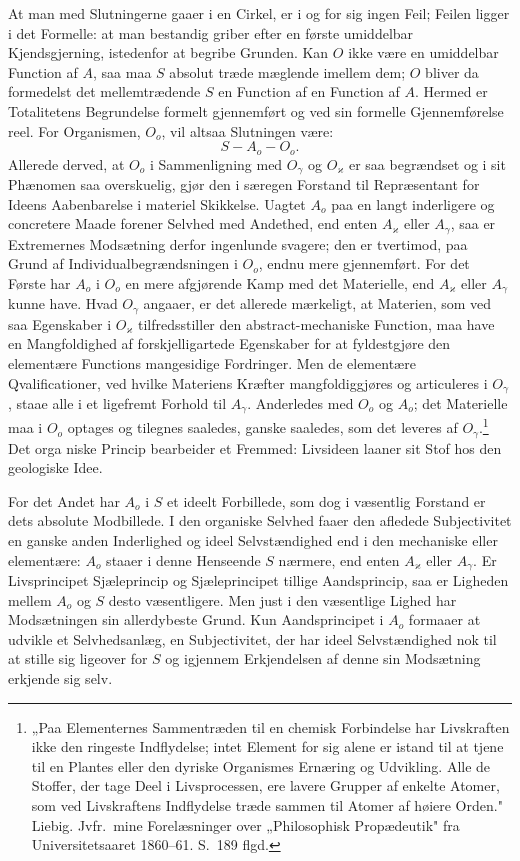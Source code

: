 \documentclass[12pt]{book}
\newcommand{\apage}[1]{\marginnote{\footnotesize\textit{[#1]}}}
\begin{document}
At man med Slutningerne gaaer i en Cirkel, er i og for sig ingen Feil; Feilen ligger i det Formelle:
at man bestandig griber efter en første umiddelbar Kjendsgjerning, istedenfor at begribe Grunden. Kan
$O$ ikke være en umiddelbar Function af $A$, saa maa $S$ absolut træde mæglende imellem dem; %
$O$ bliver da formedelst det mellemtrædende $S$ en Function af en Function af $A$. Hermed er
Totalitetens Begrundelse formelt gjennemført og ved sin formelle Gjennemførelse reel. For Organismen,
$O_o$, vil altsaa Slutningen være:
\[ S - A_o - O_o. \]
Allerede derved, at $O_o$ i Sammenligning med $O_\gamma$ og $O_{\varkappa}$ er saa begrændset og i sit
Phænomen saa overskuelig, gjør den i særegen Forstand til Repræsentant for Ideens Aabenbarelse i
materiel Skikkelse. Uagtet $A_o$ paa en langt inderligere og concretere Maade forener Selvhed med
Andethed, end enten $A_{\varkappa}$ eller $A_\gamma$, saa er Extremernes Modsætning derfor ingenlunde
svagere; den er tvertimod, paa Grund af Individualbegrændsningen i $O_o$, endnu mere gjennemført. For
det Første har $A_o$ i $O_o$ en mere afgjørende Kamp med det Materielle, end $A_{\varkappa}$ eller
$A_\gamma$ kunne have. Hvad $O_\gamma$ angaaer, er det allerede mærkeligt, at Materien, som ved saa
Egenskaber i $O_{\varkappa}$ tilfredsstiller den abstract-mechaniske Function, maa have en
Mangfoldighed af forskjelligartede Egenskaber for at fyldestgjøre den elementære Functions
mangesidige Fordringer. Men de elementære Qvalificationer, ved hvilke Materiens Kræfter
mangfoldiggjøres og articuleres i $O_\gamma$, staae alle i et ligefremt Forhold til $A_\gamma$.
Anderledes med $O_o$ og $A_o$; det Materielle maa i $O_o$ optages og tilegnes saaledes, ganske
saaledes, som det leveres af $O_\gamma$.\footnote{„Paa Elementernes Sammentræden til en chemisk
Forbindelse har Livskraften ikke den ringeste Indflydelse; intet Element for sig alene er istand til
at tjene til en Plantes eller den dyriske Organismes Ernæring og Udvikling. Alle de Stoffer, der tage
Deel i Livsprocessen, ere lavere Grupper af enkelte Atomer, som ved Livskraftens Indflydelse træde
sammen til Atomer af høiere Orden." Liebig. Jvfr.\ mine Forelæsninger over „Philosophisk Propædeutik"
fra Universitetsaaret 1860--61. S.~189 flgd.} Det orga\-%
niske \apage{444} Princip bearbeider et Fremmed: Livsideen laaner sit Stof hos den geologiske Idee.

For det Andet har $A_o$ i $S$ et ideelt Forbillede, som dog i væsentlig Forstand er dets absolute
Modbillede. I den organiske Selvhed faaer den afledede Subjectivitet en ganske anden Inderlighed og
ideel Selvstændighed end i den mechaniske eller elementære: $A_o$ staaer i denne Henseende $S$
nærmere, end enten $A_{\varkappa}$ eller $A_\gamma$. Er Livsprincipet Sjæleprincip og Sjæleprincipet
tillige Aandsprincip, saa er Ligheden mellem $A_o$ og $S$ desto væsentligere. Men just i den
væsentlige Lighed har Modsætningen sin allerdybeste Grund. Kun Aandsprincipet i $A_o$ formaaer at
udvikle et Selvhedsanlæg, en Subjectivitet, der har ideel Selvstændighed nok til at stille sig
ligeover for $S$ og igjennem Erkjendelsen af denne sin Modsætning erkjende sig selv.
\end{document}

